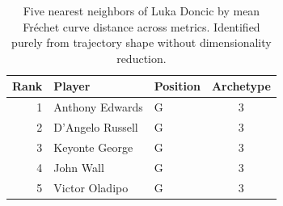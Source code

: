 \begin{table}[htbp]
  \centering\small
  \begin{tabular}{rllc}
    \toprule
    Rank & Player & Position & Archetype \\
    \midrule
    1 & Anthony Edwards & G & 3 \\
    2 & D'Angelo Russell & G & 3 \\
    3 & Keyonte George & G & 3 \\
    4 & John Wall & G & 3 \\
    5 & Victor Oladipo & G & 3 \\
    \bottomrule
  \end{tabular}
  \caption{Five nearest neighbors of Luka Doncic by mean Fr\'{e}chet curve distance across metrics. Identified purely from trajectory shape without dimensionality reduction.}
  \label{tab:Luka_Doncic_frechet_curve_neighbors}
\end{table}

